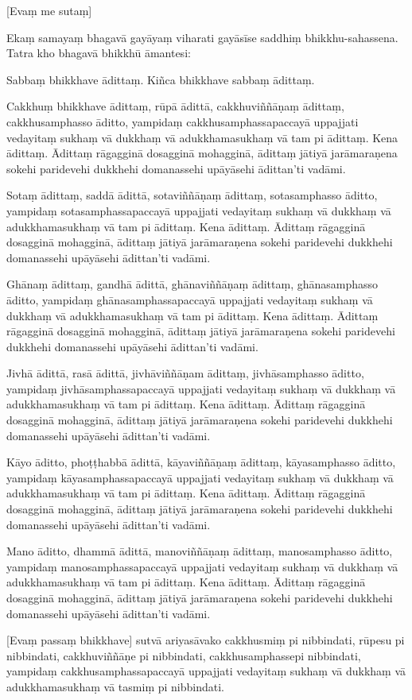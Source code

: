 [Evaṃ me sutaṃ]

Ekaṃ samayaṃ bhagavā gayāyaṃ viharati gayāsīse saddhiṃ bhikkhu-sahassena.
Tatra kho bhagavā bhikkhū āmantesi:

Sabbaṃ bhikkhave ādittaṃ. Kiñca bhikkhave sabbaṃ ādittaṃ.

Cakkhuṃ bhikkhave ādittaṃ, rūpā ādittā, cakkhuviññāṇaṃ ādittaṃ,
cakkhusamphasso āditto, yampidaṃ cakkhusamphassapaccayā uppajjati
vedayitaṃ sukhaṃ vā dukkhaṃ vā adukkhamasukhaṃ vā tam pi ādittaṃ. Kena
ādittaṃ. Ādittaṃ rāgagginā dosagginā mohagginā, ādittaṃ jātiyā
jarāmaraṇena sokehi paridevehi dukkhehi domanassehi upāyāsehi ādittan'ti
vadāmi.

Sotaṃ ādittaṃ, saddā ādittā, sotaviññāṇaṃ ādittaṃ, sotasamphasso āditto,
yampidaṃ sotasamphassapaccayā uppajjati vedayitaṃ sukhaṃ vā dukkhaṃ vā
adukkhamasukhaṃ vā tam pi ādittaṃ. Kena ādittaṃ. Ādittaṃ rāgagginā
dosagginā mohagginā, ādittaṃ jātiyā jarāmaraṇena sokehi paridevehi
dukkhehi domanassehi upāyāsehi ādittan'ti vadāmi.

Ghānaṃ ādittaṃ, gandhā ādittā, ghānaviññāṇaṃ ādittaṃ, ghānasamphasso
āditto, yampidaṃ ghānasamphassapaccayā uppajjati vedayitaṃ sukhaṃ vā
dukkhaṃ vā adukkhamasukhaṃ vā tam pi ādittaṃ. Kena ādittaṃ. Ādittaṃ
rāgagginā dosagginā mohagginā, ādittaṃ jātiyā jarāmaraṇena sokehi
paridevehi dukkhehi domanassehi upāyāsehi ādittan'ti vadāmi.

Jivhā ādittā, rasā ādittā, jivhāviññāṇam ādittaṃ, jivhāsamphasso āditto,
yampidaṃ jivhāsamphassapaccayā uppajjati vedayitaṃ sukhaṃ vā dukkhaṃ vā
adukkhamasukhaṃ vā tam pi ādittaṃ. Kena ādittaṃ. Ādittaṃ rāgagginā
dosagginā mohagginā, ādittaṃ jātiyā jarāmaraṇena sokehi paridevehi
dukkhehi domanassehi upāyāsehi ādittan'ti vadāmi.

Kāyo āditto, phoṭṭhabbā ādittā, kāyaviññāṇaṃ ādittaṃ, kāyasamphasso
āditto, yampidaṃ kāyasamphassapaccayā uppajjati vedayitaṃ sukhaṃ vā
dukkhaṃ vā adukkhamasukhaṃ vā tam pi ādittaṃ. Kena ādittaṃ. Ādittaṃ
rāgagginā dosagginā mohagginā, ādittaṃ jātiyā jarāmaraṇena sokehi
paridevehi dukkhehi domanassehi upāyāsehi ādittan'ti vadāmi.

Mano āditto, dhammā ādittā, manoviññāṇaṃ ādittaṃ, manosamphasso āditto,
yampidaṃ manosamphassapaccayā uppajjati vedayitaṃ sukhaṃ vā dukkhaṃ vā
adukkhamasukhaṃ vā tam pi ādittaṃ. Kena ādittaṃ. Ādittaṃ rāgagginā
dosagginā mohagginā, ādittaṃ jātiyā jarāmaraṇena sokehi paridevehi
dukkhehi domanassehi upāyāsehi ādittan'ti vadāmi.

[Evaṃ passaṃ bhikkhave] sutvā ariyasāvako cakkhusmiṃ pi nibbindati,
rūpesu pi nibbindati, cakkhuviññāṇe pi nibbindati, cakkhusamphassepi
nibbindati, yampidaṃ cakkhusamphassapaccayā uppajjati vedayitaṃ sukhaṃ
vā dukkhaṃ vā adukkhamasukhaṃ vā tasmiṃ pi nibbindati.

